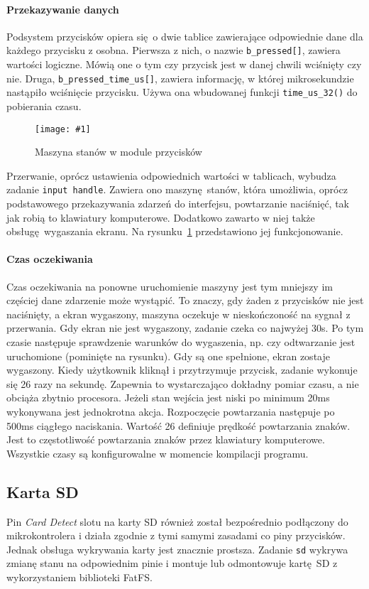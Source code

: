 \documentclass[12pt]{report}
\newcommand{\imgint}[4]{
	\begin{figure}[{#4}]
		\centering
		\texttt{[image: \#1]}
		\caption{#2}
		\label{#1}
	\end{figure}
}
\newcommand{\imgh}[3]{\imgint{#1}{#2}{#3}{H}}
\begin{document}
			\paragraph{Przekazywanie danych}
				Podsystem przycisków opiera się o dwie tablice zawierające odpowiednie dane dla każdego przycisku z osobna. Pierwsza z nich, o nazwie \lstinline|b_pressed[]|, zawiera wartości logiczne. Mówią one o tym czy przycisk jest w danej chwili wciśnięty czy nie. Druga, \lstinline|b_pressed_time_us[]|, zawiera informację, w której mikrosekundzie nastąpiło wciśnięcie przycisku. Używa ona wbudowanej funkcji \lstinline|time_us_32()| do pobierania czasu.
			
			\imgh{3/PicoRadio-buttons}{Maszyna stanów w module przycisków}{0.75}
			
			Przerwanie, oprócz ustawienia odpowiednich wartości w tablicach, wybudza zadanie \lstinline|input handle|. Zawiera ono maszynę stanów, która umożliwia, oprócz podstawowego przekazywania zdarzeń do interfejsu, powtarzanie naciśnięć, tak jak robią to klawiatury komputerowe. Dodatkowo zawarto w niej także obsługę wygaszania ekranu. Na rysunku~\ref{3/PicoRadio-buttons} przedstawiono jej funkcjonowanie.
			
			\paragraph{Czas oczekiwania}
				Czas oczekiwania na ponowne uruchomienie maszyny jest tym mniejszy im częściej dane zdarzenie może wystąpić. To znaczy, gdy żaden z przycisków nie jest naciśnięty, a ekran wygaszony, maszyna oczekuje w nieskończoność na sygnał z przerwania. Gdy ekran nie jest wygaszony, zadanie czeka co najwyżej 30s. Po tym czasie następuje sprawdzenie warunków do wygaszenia, np. czy odtwarzanie jest uruchomione (pominięte na rysunku). Gdy są one spełnione, ekran zostaje wygaszony. Kiedy użytkownik kliknął i przytrzymuje przycisk, zadanie wykonuje się 26 razy na sekundę. Zapewnia to wystarczająco dokładny pomiar czasu, a nie obciąża zbytnio procesora. Jeżeli stan wejścia jest niski po minimum 20ms wykonywana jest jednokrotna akcja. Rozpoczęcie powtarzania następuje po 500ms ciągłego naciskania. Wartość 26 definiuje prędkość powtarzania znaków. Jest to częstotliwość powtarzania znaków przez klawiatury komputerowe. Wszystkie czasy są konfigurowalne w momencie kompilacji programu.
		
		\subsection{Karta SD}
			Pin \textit{Card Detect} slotu na karty SD również został bezpośrednio podłączony do mikrokontrolera i działa zgodnie z tymi samymi zasadami co piny przycisków. Jednak obsługa wykrywania karty jest znacznie prostsza. Zadanie \lstinline|sd| wykrywa zmianę stanu na odpowiednim pinie i montuje lub odmontowuje kartę SD z wykorzystaniem biblioteki FatFS.
			
\end{document}
